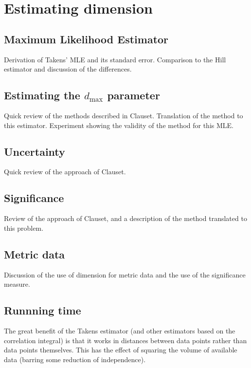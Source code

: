 \documentclass[11pt]{article}
\begin{document}
\section{Estimating dimension}

\subsection{Maximum Likelihood Estimator}

Derivation of Takens' MLE and its standard error. Comparison to the Hill estimator and discussion of the differences.
 
\subsection{Estimating the $d_{\max}$ parameter}

Quick review of the methods described in Clauset. Translation of the method to this estimator. Experiment showing the validity of the method for this MLE.

\subsection{Uncertainty}

Quick review of the approach of Clauset.

\subsection{Significance}

Review of the approach of Clauset, and a description of the method translated to this problem.

\subsection{Metric data}

Discussion of the use of dimension for metric data and the use of the significance measure.

\subsection{Runnning time}

The great benefit of the Takens estimator (and other estimators based on the correlation integral) is that it works in distances between data points rather than data points themselves. This has the effect of squaring the volume of available data (barring some reduction of independence).
\end{document}
